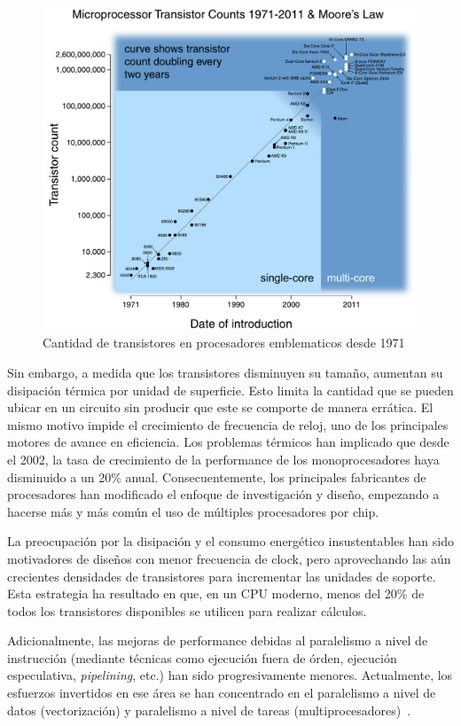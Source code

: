 \begin{figure}[htbp]
   \centering
   \includegraphics[width=\textwidth]{images/moore-law.pdf}
   \caption{Cantidad de transistores en procesadores emblematicos desde 1971}
   \label{moore-law}
\end{figure}

Sin embargo, a medida que los transistores disminuyen su tama\~no, aumentan su disipaci\'on t\'ermica por unidad de superficie.
Esto limita la cantidad que se pueden ubicar en un circuito sin producir que este se comporte de manera err\'atica. 
El mismo motivo impide el crecimiento de frecuencia de reloj, uno de los principales motores de avance en eficiencia. 
Los problemas t\'ermicos han implicado que desde el 2002, la tasa de crecimiento de la performance de los monoprocesadores haya disminuido a un 20\% anual.
Consecuentemente, los principales fabricantes de procesadores han modificado el enfoque de investigaci\'on y dise\~no, empezando a hacerse m\'as y m\'as com\'un el uso de m\'ultiples procesadores por chip.

La preocupaci\'on por la disipaci\'on y el consumo energ\'etico insustentables han sido motivadores de dise\~nos con menor frecuencia de clock, pero aprovechando las a\'un crecientes densidades de transistores para incrementar las unidades de soporte. 
Esta estrategia ha resultado en que, en un CPU moderno, menos del 20\% de todos los transistores disponibles se utilicen para realizar c\'alculos.

Adicionalmente, las mejoras de performance debidas al paralelismo a nivel de instrucci\'on (mediante t\'ecnicas como ejecuci\'on fuera de \'orden, ejecuci\'on especulativa, \textit{pipelining}, etc.) han sido progresivamente menores. 
Actualmente, los esfuerzos invertidos en ese \'area se han concentrado en el paralelismo a nivel de datos (vectorizaci\'on) y paralelismo a nivel de tareas (multiprocesadores)~\cite{HennessyPatterson}.

